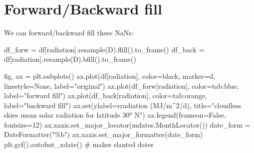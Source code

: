 \documentclass[
  letterpaper,
  DIV=11,
  numbers=noendperiod,
  oneside]{scrreprt}
\newenvironment{Shaded}{\begin{snugshade}}{\end{snugshade}}
\newcommand{\BuiltInTok}[1]{\textcolor[rgb]{0.00,0.23,0.31}{#1}}
\newcommand{\CommentTok}[1]{\textcolor[rgb]{0.37,0.37,0.37}{#1}}
\newcommand{\DecValTok}[1]{\textcolor[rgb]{0.68,0.00,0.00}{#1}}
\newcommand{\NormalTok}[1]{\textcolor[rgb]{0.00,0.23,0.31}{#1}}
\newcommand{\OperatorTok}[1]{\textcolor[rgb]{0.37,0.37,0.37}{#1}}
\newcommand{\StringTok}[1]{\textcolor[rgb]{0.13,0.47,0.30}{#1}}
\newcommand{\VariableTok}[1]{\textcolor[rgb]{0.07,0.07,0.07}{#1}}
\newcommand{\VerbatimStringTok}[1]{\textcolor[rgb]{0.13,0.47,0.30}{#1}}
\begin{document}
\hypertarget{forwardbackward-fill}{%
\section{Forward/Backward fill}\label{forwardbackward-fill}}

We can forward/backward fill these NaNs:

\begin{Shaded}
\begin{Highlighting}[]
\NormalTok{df\_forw }\OperatorTok{=}\NormalTok{ df[}\StringTok{\textquotesingle{}radiation\textquotesingle{}}\NormalTok{].resample(}\StringTok{\textquotesingle{}D\textquotesingle{}}\NormalTok{).ffill().to\_frame()}
\NormalTok{df\_back }\OperatorTok{=}\NormalTok{ df[}\StringTok{\textquotesingle{}radiation\textquotesingle{}}\NormalTok{].resample(}\StringTok{\textquotesingle{}D\textquotesingle{}}\NormalTok{).bfill().to\_frame()}
\end{Highlighting}
\end{Shaded}

\begin{Shaded}
\begin{Highlighting}[]
\NormalTok{fig, ax }\OperatorTok{=}\NormalTok{ plt.subplots()}
\NormalTok{ax.plot(df[}\StringTok{\textquotesingle{}radiation\textquotesingle{}}\NormalTok{], color}\OperatorTok{=}\StringTok{\textquotesingle{}black\textquotesingle{}}\NormalTok{, marker}\OperatorTok{=}\StringTok{\textquotesingle{}d\textquotesingle{}}\NormalTok{, linestyle}\OperatorTok{=}\StringTok{\textquotesingle{}None\textquotesingle{}}\NormalTok{, label}\OperatorTok{=}\StringTok{"original"}\NormalTok{)}
\NormalTok{ax.plot(df\_forw[}\StringTok{\textquotesingle{}radiation\textquotesingle{}}\NormalTok{], color}\OperatorTok{=}\StringTok{\textquotesingle{}tab:blue\textquotesingle{}}\NormalTok{, label}\OperatorTok{=}\StringTok{"forward fill"}\NormalTok{)}
\NormalTok{ax.plot(df\_back[}\StringTok{\textquotesingle{}radiation\textquotesingle{}}\NormalTok{], color}\OperatorTok{=}\StringTok{\textquotesingle{}tab:orange\textquotesingle{}}\NormalTok{, label}\OperatorTok{=}\StringTok{"backward fill"}\NormalTok{)}
\NormalTok{ax.}\BuiltInTok{set}\NormalTok{(ylabel}\OperatorTok{=}\VerbatimStringTok{r\textquotesingle{}radiation (MJ/m$\^{}2$/d)\textquotesingle{}}\NormalTok{,}
\NormalTok{       title}\OperatorTok{=}\StringTok{"cloudless skies mean solar radiation for latitude 30° N"}\NormalTok{)}
\NormalTok{ax.legend(frameon}\OperatorTok{=}\VariableTok{False}\NormalTok{, fontsize}\OperatorTok{=}\DecValTok{12}\NormalTok{)}
\NormalTok{ax.xaxis.set\_major\_locator(mdates.MonthLocator())}
\NormalTok{date\_form }\OperatorTok{=}\NormalTok{ DateFormatter(}\StringTok{"\%b"}\NormalTok{)}
\NormalTok{ax.xaxis.set\_major\_formatter(date\_form)}
\NormalTok{plt.gcf().autofmt\_xdate()  }\CommentTok{\# makes slanted dates}
\end{Highlighting}
\end{Shaded}
\end{document}
